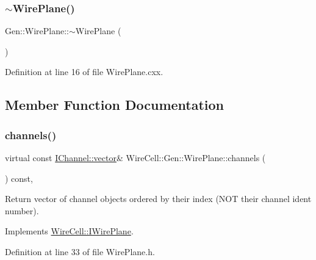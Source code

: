 \subsubsection{\texorpdfstring{$\sim$\+Wire\+Plane()}{~WirePlane()}}
{\footnotesize\ttfamily Gen\+::\+Wire\+Plane\+::$\sim$\+Wire\+Plane (\begin{DoxyParamCaption}{ }\end{DoxyParamCaption})\hspace{0.3cm}{\ttfamily [virtual]}}



Definition at line 16 of file Wire\+Plane.\+cxx.



\subsection{Member Function Documentation}
\mbox{\label{class_wire_cell_1_1_gen_1_1_wire_plane_aa338b325c5266d901cd8d9656aa025c0}} 
\subsubsection{\texorpdfstring{channels()}{channels()}}
{\footnotesize\ttfamily virtual const \hyperlink{class_wire_cell_1_1_i_data_ae1a9f863380499bb43f39fabb6276660}{I\+Channel\+::vector}\& Wire\+Cell\+::\+Gen\+::\+Wire\+Plane\+::channels (\begin{DoxyParamCaption}{ }\end{DoxyParamCaption}) const\hspace{0.3cm}{\ttfamily [inline]}, {\ttfamily [virtual]}}

Return vector of channel objects ordered by their index (N\+OT their channel ident number). 

Implements \hyperlink{class_wire_cell_1_1_i_wire_plane_ad8bbb5fc7d09e19ea546262b8162a3c0}{Wire\+Cell\+::\+I\+Wire\+Plane}.



Definition at line 33 of file Wire\+Plane.\+h.

\mbox{\label{class_wire_cell_1_1_gen_1_1_wire_plane_ab043322069a1487486a32e0744897357}} 
